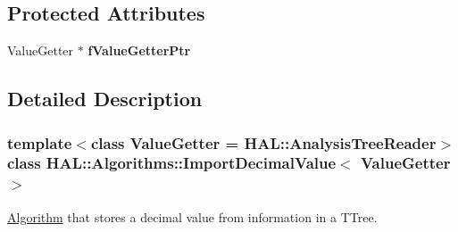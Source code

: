 \subsection*{Protected Attributes}
\begin{DoxyCompactItemize}
\item 
\hypertarget{class_h_a_l_1_1_algorithms_1_1_import_decimal_value_abd097dd9e4459fe8c726305e602f1def}{Value\+Getter $\ast$ {\bfseries f\+Value\+Getter\+Ptr}}\label{class_h_a_l_1_1_algorithms_1_1_import_decimal_value_abd097dd9e4459fe8c726305e602f1def}

\end{DoxyCompactItemize}


\subsection{Detailed Description}
\subsubsection*{template$<$class Value\+Getter = H\+A\+L\+::\+Analysis\+Tree\+Reader$>$class H\+A\+L\+::\+Algorithms\+::\+Import\+Decimal\+Value$<$ Value\+Getter $>$}

\hyperlink{class_h_a_l_1_1_algorithm}{Algorithm} that stores a decimal value from information in a T\+Tree. 

